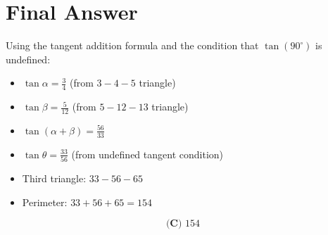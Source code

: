 \documentclass[12pt]{article}
\begin{document}
\section*{Final Answer}

Using the tangent addition formula and the condition that $\tan(90^{\circ})$ is undefined:

\begin{itemize}
    \item $\tan\alpha = \frac{3}{4}$ (from $3-4-5$ triangle)
    \item $\tan\beta = \frac{5}{12}$ (from $5-12-13$ triangle)
    \item $\tan(\alpha + \beta) = \frac{56}{33}$
    \item $\tan\theta = \frac{33}{56}$ (from undefined tangent condition)
    \item Third triangle: $33-56-65$
    \item Perimeter: $33 + 56 + 65 = 154$
\end{itemize}

$$\boxed{\textbf{(C) } 154}$$
\end{document}
